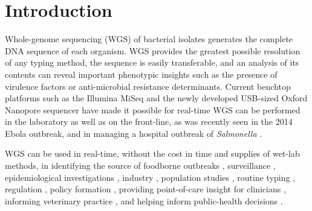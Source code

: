 \documentclass[doublespacing, linenumbers]{bmcart}
\begin{document}


\section*{Introduction}
Whole-genome sequencing (WGS) of bacterial isolates generates the complete DNA sequence of each organism. WGS provides the greatest possible resolution of any typing method, the sequence is easily transferable, and an analysis of its contents can reveal important phenotypic insights such as the presence of virulence factors or anti-microbial resistance determinants. Current benchtop platforms such as the Illumina MiSeq and the newly developed USB-sized Oxford Nanopore sequencer have made it possible for real-time WGS can be performed in the laboratory as well as on the front-line, as was recently seen in the 2014 Ebola outbreak, and in managing a hospital outbreak of \textit{Salmonella} \cite{jones_technology:_2015,gilchrist_whole-genome_2015,birmingham_how_2015,quick_rapid_2015}.

WGS can be used in real-time, without the cost in time and supplies of wet-lab methods, in identifying the source of foodborne outbreaks \cite{graham_real-time_2014}, surveillance \cite{zankari_genotyping_2013,cody_real-time_2013},  epidemiological investigations \cite{cody_real-time_2013}, industry \cite{andreevskaya_genome_2015,mazzaglia_pseudomonas_2012}, population studies \cite{nasser_evolutionary_2014,kopac_genomic_2014}, routine typing \cite{zhang_salmonella_2015}, regulation \cite{halachev_genomic_2014}, policy formation , providing point-of-care insight for clinicians \cite{grad_epidemiologic_2014,jr_next-generation_2012}, informing veterinary practice \cite{biek_whole_2012}, and helping inform public-health decisions \cite{lemke_stakeholder_2015}.
\end{document}
